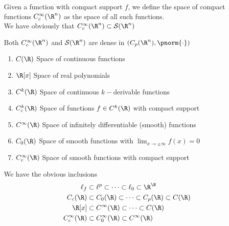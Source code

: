 \documentclass[../mmf.tex]{subfiles}
\begin{document}
\begin{dfn}
	Given a function with compact support $f$, we define the space of compact functions $C_c^{\infty}(\R^n)$ as the space of all such functions.\\
	We have obviously that $C_c^\infty(\R^n)\subset\mathcal{S}(\R^n)$
\end{dfn}
\begin{thm}
	Both $C_c^\infty(\R^n)$ and $\mathcal{S}(\R^n)$ are dense in $(C_p(\R^n),\pnorm{\cdot})$
\end{thm}
\begin{thm}
	\begin{enumerate}
	\item $C(\R)$ Space of continuous functions
	\item $\R[x]$ Space of real polynomials
	\item $C^k(\R)$ Space of continuous $k-$derivable functions
	\item $C^k_c(\R)$ Space of functions $f\in C^k(\R)$ with compact support
	\item $C^\infty(\R)$ Space of infinitely differentiable (smooth) functions
	\item $C_0(\R)$ Space of smooth functions with $\lim_{x\to\pm\infty}f(x)=0$
	\item $C_c^\infty(\R)$ Space of smooth functions with compact support
	\end{enumerate}
	We have the obvious inclusions
	\begin{equation*}
		\begin{aligned}
			\ell_f&\subset\ell^p\subset\cdots\subset\ell_0\subset\R^{\N}\\
			C_c(\R)&\subset C_0(\R)\subset\cdots\subset C_p(\R)\subset C(\R)\\
			\R[x]&\subset C^\infty(\R)\subset\cdots\subset C(\R)\\
			C_c^\infty(\R)&\subset C_0^\infty(\R)\subset C^\infty(\R)
		\end{aligned}
	\end{equation*}
\end{thm}
\end{document}
